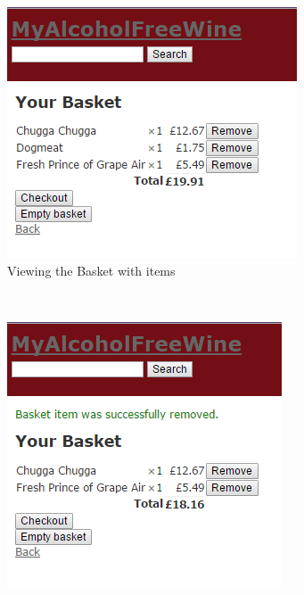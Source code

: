 \documentclass[12pt]{article}
\begin{document}
\begin{figure}[H]
    \centering
    \begin{subfigure}[b]{0.3\textwidth}
        \includegraphics[width=\textwidth]{assets/FR5_screen_1}
        \caption{Viewing the Basket with items}
        \label{fig:FR5 view Basket}
    \end{subfigure}
    ~ %
    \begin{subfigure}[b]{0.3\textwidth}
        \includegraphics[width=\textwidth]{assets/FR5_screen_2}

\end{subfigure}
\end{figure}
\end{document}
